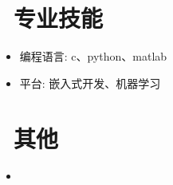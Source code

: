 \documentclass{resume}
\begin{document}
\section{\faCogs\ 专业技能}
\begin{itemize}[parsep=0.5ex]
  \item 编程语言: c、python、matlab
  \item 平台: 嵌入式开发、机器学习
\end{itemize}

\section{\faFlickr\ 其他}
\begin{onehalfspacing}
    \begin{itemize}
      \item {}
    \end{itemize}
    \end{onehalfspacing}
\end{document}
